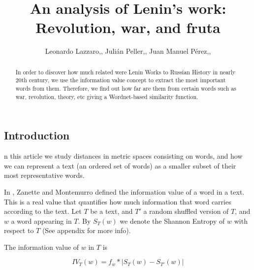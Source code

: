 \documentclass{pnastwo}
\begin{document}
\title{An analysis of Lenin's work: Revolution, war, and fruta}

\author{Leonardo Lazzaro,,
Julián Peller,,
Juan Manuel Pérez,,
}


\maketitle

\begin{article}
\begin{abstract}
In order to discover how much related were Lenin Works to Russian History in nearly 20th century, we use the information value concept to extract the most important words from them. Therefore, we find out how far are them from certain words such as
war, revolution, theory, etc giving a Wordnet-based similarity function. 
\end{abstract}



\section{Introduction}

n this article we study distances in metric spaces consisting on words, and how we can
represent a text (an ordered set of words) as a smaller subset of their most representative words.

In \cite{DARWIN}, Zanette and Montemurro defined the information value of a word in a text. This is
a real value that quantifies how much information that word carries according to the text. Let $T$ be a 
text, and $T'$ a random shuffled version of $T$, and $w$ a word appearing in $T$. 
By $S_T(w)$ we denote the Shannon Entropy of $w$ with respect to $T$ (See appendix for more info). 

The information value of $w$ in $T$ is 

\begin{equation}
  IV_T(w) = f_w* | S_T(w) - S_{T'}(w) | 
\end{equation}


\end{article}
\end{document}
